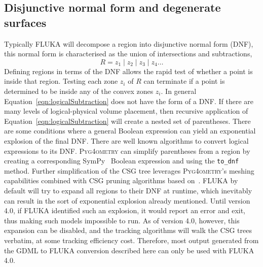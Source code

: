 \documentclass[final,5p,times,twocolumn]{elsarticle}
\newcommand{\PYGEOMETRY}{\textsc{Pyg4ometry}}
\begin{document}
\subsection{Disjunctive normal form and degenerate surfaces}
Typically FLUKA will decompose a region into disjunctive normal form (DNF), this normal form is 
characterised as the union of intersections and subtractions,
\begin{equation}
R = z_1 \; | \;z_2\;  | \; z_3 	\; | \; z_4 \dots
\end{equation}
Defining regions in terms of the DNF allows the rapid test of whether a point is inside that region. Testing each zone 
$z_i$ of $R$ can terminate if a point is determined to be inside any of the convex zones $z_i$. In general 
Equation~\ref{eqn:logicalSubtraction} does not have the form of a DNF. If there are many levels of logical-physical volume 
placement, then recursive application of  Equation~\ref{eqn:logicalSubtraction} will create a nested set of 
parentheses. There are some conditions where a general Boolean expression can yield an exponential 
explosion of the final DNF. There are well known algorithms to convert logical expressions to its DNF. 
\PYGEOMETRY{} can simplify parentheses from a region by creating a corresponding SymPy~\cite{10.7717/peerj-cs.103} Boolean
expression and using the \verb|to_dnf| method.  Further simplification of the CSG tree leverages \PYGEOMETRY{}'s
meshing capabilities combined with CSG pruning algorithms based
on~\cite{pruning}.  FLUKA by default will try to expand all regions to
their DNF at runtime, which inevitably can result in the sort of exponential explosion already mentioned.  Until version 4.0, if FLUKA identified 
such an explosion, it would report an error and exit, thus making such models impossible to run.  As of version 4.0, however, this
expansion can be disabled, and the tracking algorithms will walk the CSG trees verbatim, at some tracking efficiency cost.  Therefore, most 
output generated from the GDML to FLUKA conversion described here can only be used with FLUKA 4.0.
\end{document}
